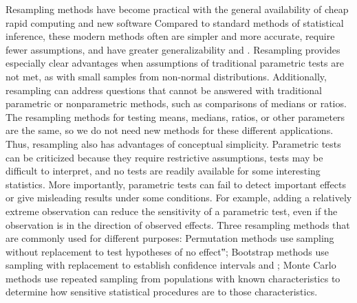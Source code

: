 \documentclass{article}
\begin{document}
Resampling methods have become practical with the general availability of cheap rapid
computing and new software Compared to standard methods of statistical inference, these
modern methods often are simpler and more accurate, require fewer assumptions, and have
greater generalizability\cite{pmid28898401} and \cite{mooney1993bootstrapping}. Resampling provides especially clear advantages when assumptions of
traditional parametric tests are not met, as with small samples from non-normal distributions\cite{pmid26634076}.
Additionally, resampling can address questions that cannot be answered with traditional
parametric or nonparametric methods, such as comparisons of medians or ratios. The resampling
methods for testing means, medians, ratios, or other parameters are the same, so we do not need
new methods for these different applications. Thus, resampling also has advantages of
conceptual simplicity.
Parametric tests can be criticized because they require restrictive assumptions, tests may be
difficult to interpret, and no tests are readily available for some interesting statistics. More
importantly, parametric tests can fail to detect important effects or give misleading results under some conditions\cite{pmid26831402}. For example, adding a relatively extreme observation can reduce the sensitivity
of a parametric test, even if the observation is in the direction of observed effects. 
Three resampling methods that are commonly used for different purposes:
Permutation methods use sampling without replacement to test hypotheses of no effect‟;
Bootstrap methods use sampling with replacement to establish confidence intervals\cite{cirincione1997research} and \cite{zhang2010estimating};
Monte Carlo methods use repeated sampling from populations with known characteristics to
determine how sensitive statistical procedures are to those characteristics.
\end{document}

